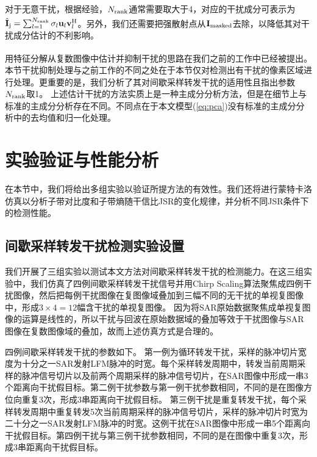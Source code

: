 \documentclass[10.5pt,UTF8]{JR}
\theoremstyle{mystyle}
\newcommand{\upcite}[1]{\textsuperscript{\cite{#1}}}
\begin{document}
对于无意干扰，根据经验，$N_{\rm rank}$通常需要取大于4，对应的干扰成分可表示为$\hat{\mathbf{I}}_{\rm j} = \sum_{l=1}^{N_{\rm rank}} \sigma_l \mathbf{u}_l \mathbf{v}_l^{\rm H}$。另外，我们还需要把强散射点从$\mathbf{I}_{\rm masked}$去除\upcite{yang2024robust}，以降低其对干扰成分估计的不利影响。

用特征分解从复数图像中估计并抑制干扰的思路在我们之前的工作中已经被提出\upcite{yang2021bsf,yang2024robust}。本节干扰抑制处理与之前工作的不同之处在于本节仅对检测出有干扰的像素区域进行处理。更重要的是，我们分析了其对间歇采样转发干扰的适用性且指出参数$N_{\rm rank}$取1。
上述估计干扰的方法实质上是一种主成分分析方法，但是在细节上与标准的主成分分析存在不同。不同点在于本文模型(\ref{eq:pca})没有标准的主成分分析中的去均值和归一化处理。


\section{实验验证与性能分析}






在本节中，我们将给出多组实验以验证所提方法的有效性。我们还将进行蒙特卡洛仿真以分析子带对比度和子带熵随干信比JSR的变化规律，并分析不同JSR条件下的检测性能。

\subsection{间歇采样转发干扰检测实验设置}

我们开展了三组实验以测试本文方法对间歇采样转发干扰的检测能力。在这三组实验中，我们仿真了四例间歇采样转发干扰信号并用Chirp Scaling算法聚焦成四例干扰图像，然后把每例干扰图像在复图像域叠加到三幅不同的无干扰的单视复图像中，形成$3\times 4=12$幅含干扰的单视复图像。
因为将SAR原始数据聚焦成单视复图像的运算是线性的，所以干扰与回波在原始数据域的叠加等效于干扰图像与SAR图像在复数图像域的叠加，故而上述仿真方式是合理的。

四例间歇采样转发干扰的参数如下。
第一例为循环转发干扰，采样的脉冲切片宽度为十分之一SAR发射LFM脉冲的时宽。每个采样转发周期中，转发当前周期采样的脉冲信号切片以及前两个周期采样的脉冲信号切片，在SAR图像中形成一串3个距离向干扰假目标。第二例干扰参数与第一例干扰参数相同，不同的是在图像方位向重复3次，形成3串距离向干扰假目标。
第三例干扰是重复转发干扰，每个采样转发周期中重复转发5次当前周期采样的脉冲信号切片，采样的脉冲切片时宽为二十分之一SAR发射LFM脉冲的时宽。这例干扰在SAR图像中形成一串5个距离向干扰假目标。第四例干扰与第三例干扰参数相同，不同的是在图像中重复3次，形成3串距离向干扰假目标。
\end{document}
